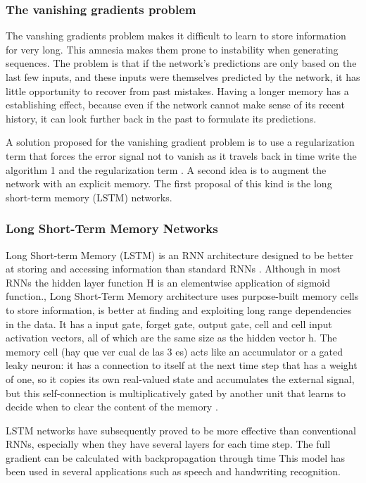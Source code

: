 \subsubsection*{The vanishing gradients problem}

The vanshing gradients problem makes it difficult to learn to store information for very long. 
This amnesia makes them prone to instability when generating sequences. The problem is that if the network's predictions  are only based on the last few inputs, and these inputs were themselves predicted by the network, it has little opportunity to recover from past mistakes. Having a longer memory has a establishing effect, because even if the network cannot make sense of its recent history, it can look further back in the past to formulate its predictions. \cite{graves2013generating}

A solution proposed for the vanishing gradient problem is to use a regularization term that forces the error signal not to vanish as it travels back in time  write the algorithm 1 and the regularization term \cite{pascanu2013difficulty}.
A second idea is to augment the network with an explicit memory. The first proposal of this kind is the long short-term memory (LSTM) networks.


\subsubsection{Long Short-Term Memory Networks}
Long Short-term Memory (LSTM) is an RNN architecture designed to be better at storing and accessing information than standard RNNs \cite{graves2013generating}.
Although in most RNNs the hidden layer function H is an elementwise application of sigmoid function.,  Long Short-Term Memory  architecture uses purpose-built memory cells to store information, is better at finding and exploiting long range dependencies in the data. It has a input gate, forget gate, output gate, cell and cell input activation vectors, all of which are the same size as the hidden vector h. \cite{graves2013generating}
The memory cell (hay que ver cual de las 3 es) acts like an accumulator or a gated leaky neuron: it has a connection to itself at the next time step that has a weight of one, so it copies its own real-valued state and accumulates the external signal, but this self-connection is multiplicatively gated by another unit that learns to decide when to clear the content of the memory \cite{lecun2015deep}.

LSTM networks have subsequently proved to be more effective than conventional RNNs, especially when they have several layers for each time step\cite{lecun2015deep}.
The full gradient can be calculated with backpropagation through time \cite{graves2013generating}
This model has been used in several applications such as speech and handwriting recognition.\cite{graves2013generating}



